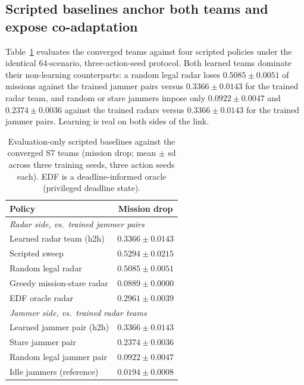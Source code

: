 \subsection{Scripted baselines anchor both teams and expose co-adaptation}
Table~\ref{tab:baselines} evaluates the converged teams against four scripted policies under the identical 64-scenario, three-action-seed protocol. Both learned teams dominate their non-learning counterparts: a random legal radar loses $0.5085\pm0.0051$ of missions against the trained jammer pairs versus $0.3366\pm0.0143$ for the trained radar team, and random or stare jammers impose only $0.0922\pm0.0047$ and $0.2374\pm0.0036$ against the trained radars versus $0.3366\pm0.0143$ for the trained jammer pairs. Learning is real on both sides of the link.

\begin{table}[t]
\caption{Evaluation-only scripted baselines against the converged S7 teams (mission drop; mean $\pm$ sd across three training seeds, three action seeds each). EDF is a deadline-informed oracle (privileged deadline state).}
\label{tab:baselines}
\centering
\small
\begin{tabular}{lc}
\toprule
Policy & Mission drop \\
\midrule
\multicolumn{2}{l}{\emph{Radar side, vs.\ trained jammer pairs}} \\
Learned radar team (h2h) & $0.3366\pm0.0143$ \\
Scripted sweep & $0.5294\pm0.0215$ \\
Random legal radar & $0.5085\pm0.0051$ \\
Greedy mission-stare radar & $0.0889\pm0.0000$ \\
EDF oracle radar & $0.2961\pm0.0039$ \\
\midrule
\multicolumn{2}{l}{\emph{Jammer side, vs.\ trained radar teams}} \\
Learned jammer pair (h2h) & $0.3366\pm0.0143$ \\
Stare jammer pair & $0.2374\pm0.0036$ \\
Random legal jammer pair & $0.0922\pm0.0047$ \\
Idle jammers (reference) & $0.0194\pm0.0008$ \\
\bottomrule
\end{tabular}
\end{table}

